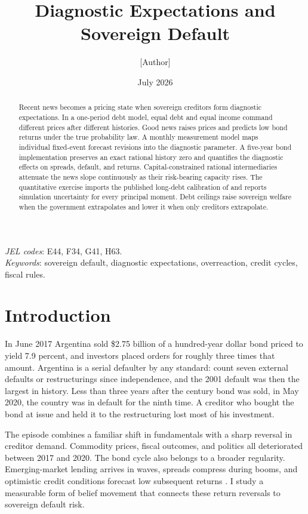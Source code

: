 \documentclass[11pt]{article}
\title{Diagnostic Expectations and Sovereign Default}
\author{[Author]}
\date{July 2026}
\theoremstyle{definition}
\begin{document}
\maketitle

\begin{abstract}
\noindent Recent news becomes a pricing state when sovereign creditors form diagnostic expectations. In a one-period debt model, equal debt and equal income command different prices after different histories. Good news raises prices and predicts low bond returns under the true probability law. A monthly measurement model maps individual fixed-event forecast revisions into the diagnostic parameter. A five-year bond implementation preserves an exact rational history zero and quantifies the diagnostic effects on spreads, default, and returns. Capital-constrained rational intermediaries attenuate the news slope continuously as their risk-bearing capacity rises. The quantitative exercise imports the published long-debt calibration of \citet{ChatterjeeEyigungor2012} and reports simulation uncertainty for every principal moment. Debt ceilings raise sovereign welfare when the government extrapolates and lower it when only creditors extrapolate.
\end{abstract}

\medskip
\noindent\textit{JEL codes}: E44, F34, G41, H63.\\
\noindent\textit{Keywords}: sovereign default, diagnostic expectations, overreaction, credit cycles, fiscal rules.

\section{Introduction}\label{sec:intro}

In June 2017 Argentina sold \$2.75 billion of a hundred-year dollar bond priced to yield 7.9 percent, and investors placed orders for roughly three times that amount. Argentina is a serial defaulter by any standard: \citet{ReinhartRogoff2009} count seven external defaults or restructurings since independence, and the 2001 default was then the largest in history. Less than three years after the century bond was sold, in May 2020, the country was in default for the ninth time. A creditor who bought the bond at issue and held it to the restructuring lost most of his investment.

The episode combines a familiar shift in fundamentals with a sharp reversal in creditor demand. Commodity prices, fiscal outcomes, and politics all deteriorated between 2017 and 2020. The bond cycle also belongs to a broader regularity. Emerging-market lending arrives in waves, spreads compress during booms, and optimistic credit conditions forecast low subsequent returns \citep{GreenwoodHanson2013, LopezSalidoSteinZakrajsek2017}. I study a measurable form of belief movement that connects these return reversals to sovereign default risk.
\end{document}
